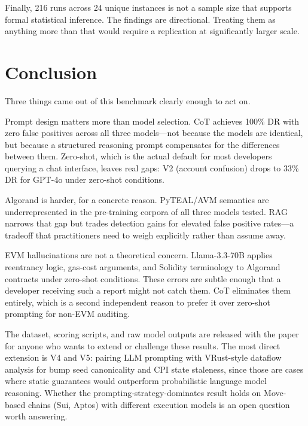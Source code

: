 \documentclass[journal]{IEEEtran}
\begin{document}
Finally, 216 runs across 24 unique instances is not a sample size that
supports formal statistical inference.
The findings are directional.
Treating them as anything more than that would require a replication at
significantly larger scale.

\section{Conclusion}
\label{sec:conclusion}

Three things came out of this benchmark clearly enough to act on.

Prompt design matters more than model selection.
CoT achieves 100\% DR with zero false positives across all three models---not
because the models are identical, but because a structured reasoning prompt
compensates for the differences between them.
Zero-shot, which is the actual default for most developers querying a chat
interface, leaves real gaps: V2 (account confusion) drops to 33\% DR for
GPT-4o under zero-shot conditions.

Algorand is harder, for a concrete reason.
PyTEAL/AVM semantics are underrepresented in the pre-training corpora of all
three models tested.
RAG narrows that gap but trades detection gains for elevated false positive
rates---a tradeoff that practitioners need to weigh explicitly rather than
assume away.

EVM hallucinations are not a theoretical concern.
Llama-3.3-70B applies reentrancy logic, gas-cost arguments, and Solidity
terminology to Algorand contracts under zero-shot conditions.
These errors are subtle enough that a developer receiving such a report might
not catch them.
CoT eliminates them entirely, which is a second independent reason to prefer
it over zero-shot prompting for non-EVM auditing.

The dataset, scoring scripts, and raw model outputs are released with the
paper for anyone who wants to extend or challenge these results.
The most direct extension is V4 and V5: pairing LLM prompting with
VRust-style dataflow analysis for bump seed canonicality and CPI state
staleness, since those are cases where static guarantees would outperform
probabilistic language model reasoning.
Whether the prompting-strategy-dominates result holds on Move-based chains
(Sui, Aptos) with different execution models is an open question worth
answering.



\end{document}
